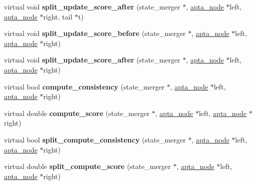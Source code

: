 \begin{DoxyCompactItemize}
virtual void {\bfseries split\+\_\+update\+\_\+score\+\_\+after} (state\+\_\+merger $\ast$, \hyperlink{classapta__node}{apta\+\_\+node} $\ast$left, \hyperlink{classapta__node}{apta\+\_\+node} $\ast$right, tail $\ast$t)
\item 
\mbox{\label{classevaluation__function_a68ba044cfaf0bcfe87bbb8f81fe87e9a}} 
virtual void {\bfseries split\+\_\+update\+\_\+score\+\_\+before} (state\+\_\+merger $\ast$, \hyperlink{classapta__node}{apta\+\_\+node} $\ast$left, \hyperlink{classapta__node}{apta\+\_\+node} $\ast$right)
\item 
\mbox{\label{classevaluation__function_a7e4677bab9bc6dd442fd1e9c7228b347}} 
virtual void {\bfseries split\+\_\+update\+\_\+score\+\_\+after} (state\+\_\+merger $\ast$, \hyperlink{classapta__node}{apta\+\_\+node} $\ast$left, \hyperlink{classapta__node}{apta\+\_\+node} $\ast$right)
\item 
\mbox{\label{classevaluation__function_a423a489d49a8156f60e2fce98d0fe525}} 
virtual bool {\bfseries compute\+\_\+consistency} (state\+\_\+merger $\ast$, \hyperlink{classapta__node}{apta\+\_\+node} $\ast$left, \hyperlink{classapta__node}{apta\+\_\+node} $\ast$right)
\item 
\mbox{\label{classevaluation__function_a38cd95b00b3ef638745968143994a8cc}} 
virtual double {\bfseries compute\+\_\+score} (state\+\_\+merger $\ast$, \hyperlink{classapta__node}{apta\+\_\+node} $\ast$left, \hyperlink{classapta__node}{apta\+\_\+node} $\ast$right)
\item 
\mbox{\label{classevaluation__function_a6fadf4eeb80af89251099015df71c836}} 
virtual bool {\bfseries split\+\_\+compute\+\_\+consistency} (state\+\_\+merger $\ast$, \hyperlink{classapta__node}{apta\+\_\+node} $\ast$left, \hyperlink{classapta__node}{apta\+\_\+node} $\ast$right)
\item 
\mbox{\label{classevaluation__function_a93db27cfcd2d3fe619720d5434ef80a3}} 
virtual double {\bfseries split\+\_\+compute\+\_\+score} (state\+\_\+merger $\ast$, \hyperlink{classapta__node}{apta\+\_\+node} $\ast$left, \hyperlink{classapta__node}{apta\+\_\+node} $\ast$right)
\item 

\end{DoxyCompactItemize}

